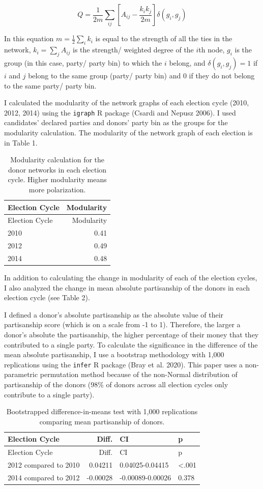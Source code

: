 \documentclass[12pt,]{article}
\begin{document}
\[Q = \frac{1}{2m} \sum_{ij}\left[A_{ij} - \frac{k_{i}k_{j}}{2m} \right]\delta(g_{i},g_{j})\]

In this equation \(m = \frac{1}{2}\sum_{i}k_{i}\) is equal to the
strength of all the ties in the network, \(k_{i}=\sum_{j}A_{ij}\) is the
strength/ weighted degree of the \(i\)th node, \(g_{i}\) is the group
(in this case, party/ party bin) to which the \(i\) belong, and
\(\delta(g_{i},g_{j}) = 1\) if \(i\) and \(j\) belong to the same group
(party/ party bin) and 0 if they do not belong to the same party/ party
bin.

I calculated the modularity of the network graphs of each election cycle
(2010, 2012, 2014) using the \texttt{igraph} R package (Csardi and
Nepusz 2006). I used candidates' declared parties and donors' party bin
as the groups for the modularity calculation. The modularity of the
network graph of each election is in Table 1.

\begin{longtable}[]{@{}lr@{}}
\caption{Modularity calculation for the donor networks in each election
cycle. Higher modularity means more polarization.}\tabularnewline
\toprule
Election Cycle & Modularity\tabularnewline
\midrule
\endfirsthead
\toprule
Election Cycle & Modularity\tabularnewline
\midrule
\endhead
2010 & 0.41\tabularnewline
2012 & 0.49\tabularnewline
2014 & 0.48\tabularnewline
\bottomrule
\end{longtable}

In addition to calculating the change in modularity of each of the
election cycles, I also analyzed the change in mean absolute
partisanship of the donors in each election cycle (see Table 2).

I defined a donor's absolute partisanship as the absolute value of their
partisanship score (which is on a scale from -1 to 1). Therefore, the
larger a donor's absolute the partisanship, the higher percentage of
their money that they contributed to a single party. To calculate the
significance in the difference of the mean absolute partisanship, I use
a bootstrap methodology with 1,000 replications using the \texttt{infer}
R package (Bray et al. 2020). This paper uses a non-parametric
permutation method because of the non-Normal distribution of
partisanship of the donors (98\% of donors across all election cycles
only contribute to a single party).

\begin{longtable}[]{@{}lrll@{}}
\caption{Bootstrapped difference-in-means test with 1,000 replications
comparing mean partisanship of donors.}\tabularnewline
\toprule
Election Cycle & Diff. & CI & p\tabularnewline
\midrule
\endfirsthead
\toprule
Election Cycle & Diff. & CI & p\tabularnewline
\midrule
\endhead
2012 compared to 2010 & 0.04211 & 0.04025-0.04415 &
\textless.001\tabularnewline
2014 compared to 2012 & -0.00028 & -0.00089-0.00026 &
0.378\tabularnewline
\bottomrule
\end{longtable}
\end{document}
